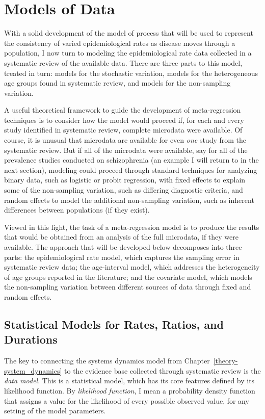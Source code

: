 \part{Models of Data}
With a solid development of the model of process that will be used to
represent the consistency of varied epidemiological rates as disease
moves through a population, I now turn to modeling the
epidemiological rate data collected in a systematic review of the
available data.  There are three parts to this model, treated in turn:
models for the stochastic variation, models for the heterogeneous age
groups found in systematic review, and models for the non-sampling
variation.

A useful theoretical framework to guide the development of
meta-regression techniques is to consider how the model would proceed
if, for each and every study identified in systematic review, complete
microdata were available.  Of course, it is unusual that microdata are
available for even \emph{one} study from the systematic review.  But
if all of the microdata were available, say for all of the prevalence
studies conducted on schizophrenia (an example I will return to in
the next section), modeling could proceed through standard techniques
for analyzing binary data, such as logistic or probit regression, with
fixed effects to explain some of the non-sampling variation, such as
differing diagnostic criteria, and random effects to model the
additional non-sampling variation, such as inherent differences
between populations (if they exist).

Viewed in this light, the task of a meta-regression model is to
produce the results that would be obtained from an analysis of the
full microdata, if they were available. The approach that will be
developed below decomposes into three parts: the epidemiological rate
model, which captures the sampling error in systematic review data;
the age-interval model, which addresses the heterogeneity of age
groups reported in the literature; and the covariate model, which
models the non-sampling variation between different sources of data
through fixed and random effects.

\chapter{Statistical Models for Rates, Ratios, and Durations}
\label{theory-rate_model}

The key to connecting the systems dynamics model from
Chapter~\ref{theory-system_dynamics} to the evidence base collected
through systematic review is the \emph{data model}.  This is a
statistical model, which has its core features defined by its
likelihood function.  By \emph{likelihood function}, I mean a
probability density function that assigns a value for the likelihood
of every possible observed value, for any setting of the model
parameters.

